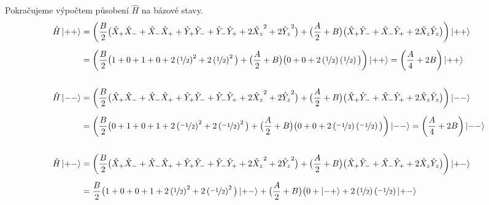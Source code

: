 \documentclass[10pt,a4paper]{article}
\newcommand{\ket}[1]{\left| #1 \right>}
\begin{document}
Pokračujeme výpočtem působení $\hat H$ na bázové stavy.
\begin{align*}
    \hat H \ket{++}
    &= \left(
        \frac{B}{2} \big(
            \hat X_+ \hat X_- + \hat X_- \hat X_+ + \hat Y_+ \hat Y_- + \hat Y_- \hat Y_+
            + 2 {\hat X_z}^2 + 2 {\hat Y_z}^2
        \big)
        + \big( \frac{A}{2} + B \big)\big(
            \hat X_+ \hat Y_- + \hat X_- \hat Y_+
            + 2 \hat X_z \hat Y_z
        \big)
    \right) \ket{++}
    \\[5pt]
    &= \left(
        \frac{B}{2} \big(
            1 + 0 + 1 + 0
            + 2 \left(\nicefrac{1}{2}\right)^2 + 2 \left(\nicefrac{1}{2}\right)^2
        \big)
        + \big( \frac{A}{2} + B \big)\big(
            0 + 0
            + 2 \left(\nicefrac{1}{2}\right) \left(\nicefrac{1}{2}\right)
        \big)
    \right) \ket{++}
    = \left( \frac{A}{4} + 2B \right) \ket{++}
    \\\\
    \hat H \ket{--}
    &= \left(
        \frac{B}{2} \big(
            \hat X_+ \hat X_- + \hat X_- \hat X_+ + \hat Y_+ \hat Y_- + \hat Y_- \hat Y_+
            + 2 {\hat X_z}^2 + 2 {\hat Y_z}^2
        \big)
        + \big( \frac{A}{2} + B \big)\big(
            \hat X_+ \hat Y_- + \hat X_- \hat Y_+
            + 2 \hat X_z \hat Y_z
        \big)
    \right) \ket{--}
    \\[5pt]
    &= \left(
        \frac{B}{2} \big(
            0 + 1 + 0 + 1
            + 2 \left(\nicefrac{-1}{2}\right)^2 + 2 \left(\nicefrac{-1}{2}\right)^2
        \big)
        + \big( \frac{A}{2} + B \big)\big(
            0 + 0
            + 2 \left(\nicefrac{-1}{2}\right) \left(\nicefrac{-1}{2}\right)
        \big)
    \right) \ket{--}
    = \left( \frac{A}{4} + 2B \right) \ket{--}
    \\\\
    \hat H \ket{+-}
    &= \left(
        \frac{B}{2} \big(
            \hat X_+ \hat X_- + \hat X_- \hat X_+ + \hat Y_+ \hat Y_- + \hat Y_- \hat Y_+
            + 2 {\hat X_z}^2 + 2 {\hat Y_z}^2
        \big)
        + \big( \frac{A}{2} + B \big)\big(
            \hat X_+ \hat Y_- + \hat X_- \hat Y_+
            + 2 \hat X_z \hat Y_z
        \big)
    \right) \ket{+-}
    \\[5pt]
    &=
    \frac{B}{2} \big(
        1 + 0 + 0 + 1
        + 2 \left(\nicefrac{1}{2}\right)^2 + 2 \left(\nicefrac{-1}{2}\right)^2
    \big)
    \ket{+-}
    +
    \big( \frac{A}{2} + B \big)\big(
        0 + \ket{-+}
        + 2 \left(\nicefrac{1}{2}\right) \left(\nicefrac{-1}{2}\right) \ket{+-}

\end{align*}
\end{document}
